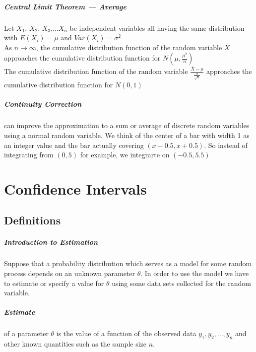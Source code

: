 \documentclass[12pt]{report}
\begin{document}
    \paragraph{Central Limit Theorem --- Average} Let $X_1$, $X_2$, $X_3$,...$X_n$
    be independent variables all having the same distribution with $E(X_i) =
    \mu$ and $Var(X_i) = \sigma^2$\\
    As $n \rightarrow \infty$, the cumulative distribution function of the
    random variable $\bar{X}$ approaches the cumulative distribution
    function for $N(\mu, \frac{\mu^2}{n})$\\
    The cumulative distribution function of the random variable $\frac{\bar{X} -
    \mu} {\frac{\sigma}{\sqrt{n}}}$ approaches the cumulative distribution
    function for $N(0, 1)$

    \paragraph{Continuity Correction} can improve the approximation to a sum or
    average of discrete random variables using a normal random variable. We
    think of the center of a bar with width 1 as an integer value and the bar
    actually covering $(x - 0.5, x + 0.5)$. So instead of integrating from $(0,
    5)$ for example, we integrarte on $(-0.5, 5.5)$

\chapter{Confidence Intervals}
  \section{Definitions}
    \paragraph{Introduction to Estimation}
      Suppose that a probability distribution which serves as a model for some
      random process depends on an unknown parameter $\theta$. In order to use
      the model we have to estimate or specify a value for $\theta$ using some
      data sets collected for the random variable.\\

    \paragraph{Estimate} of a parameter $\theta$ is the value of a function of
    the observed data $y_1, y_2, ... , y_n$ and other known quantities such as
    the sample size $n$.
\end{document}
